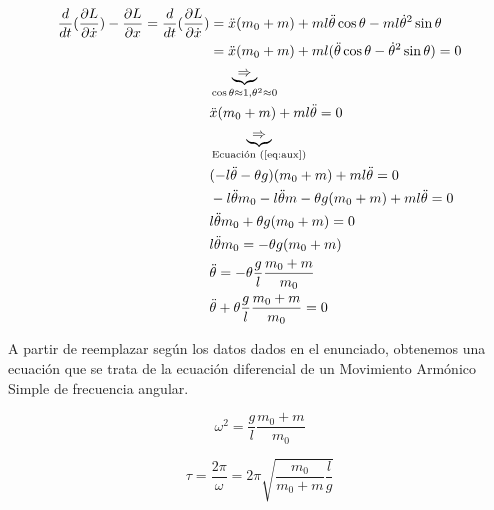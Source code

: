 \documentclass[11pt]{article}
\begin{document}
\begin{align*}
  \frac{d}{dt} (\frac{\partial L}{\partial \dot{x}}) - \frac{\partial L}{\partial x}
  =\frac{d}{dt} (\frac{\partial L}{\partial \dot{x}}) &= 
    \ddot{x}(m_0 + m) + ml\ddot{\theta} \cos \theta - ml \dot{\theta}^2 \sin \theta \\
    &= \ddot{x}(m_0 + m) + ml (\ddot{\theta} \cos \theta - \dot{\theta}^2 \sin \theta) = 0 \\
    &\underbrace{\Rightarrow}_{\cos \theta \approx 1, \theta^2 \approx 0} \\
    &\ddot{x}(m_0 + m) + ml\ddot{\theta} = 0  \\
    &\underbrace{\Rightarrow}_{\text{Ecuación (\ref{eq:aux})}} \\
    &(-l\ddot{\theta} - \theta g)(m_0 + m) +ml\ddot{\theta} = 0 \\
    &-l\ddot{\theta}m_0 - l\ddot{\theta}m - \theta g (m_0 + m) + ml\ddot{\theta} = 0 \\
    &l\ddot{\theta}m_0 + \theta g (m_0 + m) = 0 \\
    &l\ddot{\theta}m_0 = -\theta g (m_0 + m) \\
    &\ddot{\theta} = - \theta \frac{g}{l} \frac{m_0 + m}{m_0} \\
    &\ddot{\theta} + \theta \frac{g}{l} \frac{m_0 + m}{m_0} = 0
\end{align*}

A partir de reemplazar según los datos dados en el enunciado, obtenemos
una ecuación que se trata de la ecuación diferencial de un
Movimiento Armónico Simple de frecuencia angular.

\begin{equation*}
  \omega^2 = \frac{g}{l} \frac{m_0 + m}{m_0}
\end{equation*}

\begin{equation*}
  \tau = \frac{2\pi}{\omega} = 2\pi \sqrt{\frac{m_0}{m_0 + m} \frac{l}{g}}
\end{equation*}
\end{document}
